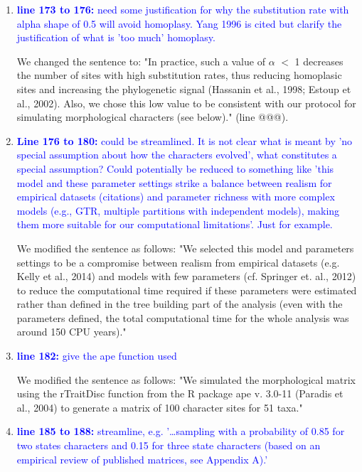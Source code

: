 \documentclass[12pt,letterpaper]{article}
\begin{document}
\begin{enumerate}
\item{\textcolor{blue}{\textbf{line 173 to 176:} need some justification for why the substitution rate with alpha shape of 0.5  will avoid homoplasy. Yang 1996 is cited but clarify the justification of what is 'too much' homoplasy. }}

We changed the sentence to:
"In practice, such a value of $\alpha$ $<$ 1 decreases the number of sites with high substitution rates, thus reducing homoplasic sites and increasing the phylogenetic signal (Hassanin et al., 1998; Estoup et al., 2002).%
Also, we chose this low value to be consistent with our protocol for simulating morphological characters (see below)." (line @@@).

\item{\textcolor{blue}{\textbf{Line 176 to 180:} could be streamlined. It is not clear what is meant by 'no special assumption about how the characters evolved', what constitutes a special assumption? Could potentially be reduced to something like 'this model and these parameter settings strike a balance between realism for empirical datasets (citations) and parameter richness with more complex models (e.g., GTR, multiple partitions with independent models), making them more suitable for our computational limitations'. Just for example.}}

We modified the sentence as follows: "We selected this model and parameters settings to be a compromise between realism from empirical datasets (e.g. Kelly et al., 2014) %
and models with few parameters (cf. Springer et. al., 2012) %
to reduce the computational time required if these parameters were estimated rather than defined in the tree building part of the analysis (even with the parameters defined, the total computational time for the whole analysis was around 150 CPU years)."

\item{\textcolor{blue}{\textbf{line 182:} give the ape function used}}

We modified the sentence as follows: "We simulated the morphological matrix using the rTraitDisc function from the R package ape v. 3.0-11 (Paradis et al., 2004) to generate a matrix of 100 character sites for 51 taxa."

\item{\textcolor{blue}{\textbf{line 185 to 188:} streamline, e.g. '…sampling with a probability of 0.85 for two states characters and 0.15 for three state characters (based on an empirical review of published matrices, see Appendix A).'}}


\end{enumerate}
\end{document}

